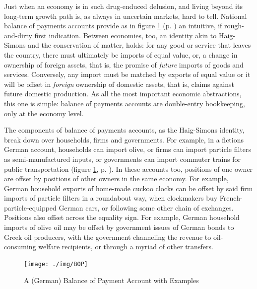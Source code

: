 \documentclass[11pt,a4paper,oneside,openright]{article}
\begin{document}
Just when an economy is in such drug-enduced delusion, and living beyond its long-term growth path is, as always in uncertain markets, hard to tell. 
National balance of payments accounts provide as in figure \ref{fig:BoP} (p. \pageref{fig:BoP}) an intuitive, if rough-and-dirty first indication. 
Between economies, too, an identity akin to Haig-Simons and the conservation of matter, holds: 
for any good or service that leaves the country, there must ultimately be imports of equal value, or, a change in ownership of foreign assets, that is, the promise of \emph{future} imports of goods and services. 
Conversely, any import must be matched by exports of equal value or it will be offset in \emph{foreign} ownership of domestic assets, that is, claims against future domestic production. 
As all the most important economic abstractions, this one is simple: 
balance of payments accounts are double-entry bookkeeping, only at the economy level.  

The components of balance of payments accounts, as the Haig-Simons identity, break down over households, firms and governments. 
For example, in a fictions German account, households can import olive, or firms can import particle filters as semi-manufactured inputs, or governments can import commuter trains for public transportation (figure \ref{fig:BoP}, p. \pageref{fig:BoP}). 
In these accounts too, positions of one owner are offset by positions of other owners in the same economy. 
For example, German household exports of home-made cuckoo clocks can be offset by said firm imports of particle filters in a roundabout way, when clockmakers buy French-particle-equipped German cars, or following some other chain of exchanges. 
Positions  also offset across the equality sign. 
For example, German household imports of olive oil may be offset by government issues of German bonds to Greek oil producers, with the government channeling the revenue to oil-consuming welfare recipients, or through a myriad of other transfers.

\begin{figure}[htbp]
	\begin{center}
	\texttt{[image: ./img/BOP]}  
	\caption{A (German) Balance of Payment Account with Examples}
	\label{fig:BoP}
	\end{center}
\end{figure}
\end{document}
